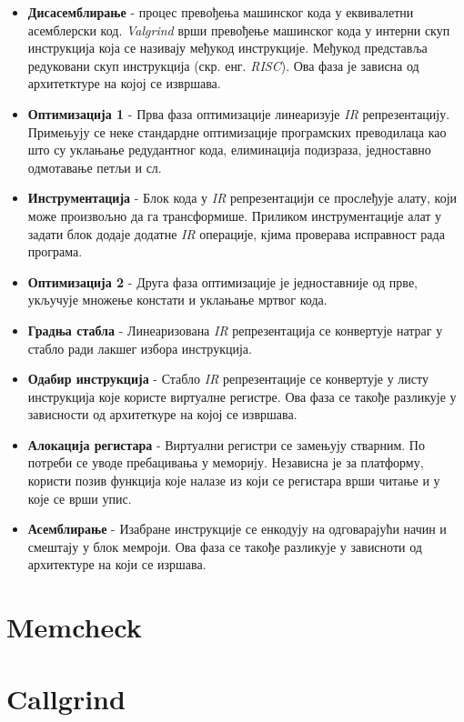 \documentclass[12pt,oneside]{memoir}
\begin{document}
\begin{itemize}
  \item \textbf{ Дисасемблирање } - процес превођења машинског кода у еквивалетни асемблерски код. \textit{Valgrind} врши превођење машинског кода у интерни скуп инструкција која се називају међукод инструкције. Међукод представља редуковани скуп инструкција (скр. енг. \textit{RISC}). Ова фаза је зависна од архитетктуре на којој се извршава.
  \item \textbf{ Оптимизација 1} - Прва фаза оптимизације линеаризује \textit{IR} репрезентацију. Примењују се неке стандардне оптимизације програмских преводилаца као што су уклањање редудантног кода, елиминација подизраза, једноставно одмотавање петљи и сл.
  \item \textbf{ Инструментација} - Блок кода у \textit{IR} репрезентацији се прослеђује алату, који може произвољно да га трансформише. Приликом инструментације алат у задати блок додаје додатне \textit{IR} операције, кјима проверава исправност рада програма.
  \item \textbf{ Оптимизација 2 } - Друга фаза оптимизације је једноставније од прве, укључује множење констати и уклањање мртвог кода.
  \item \textbf{ Градња стабла } - Линеаризована \textit{IR} репрезентација се конвертује натраг у стабло ради лакшег избора инструкција.
  \item \textbf{ Одабир инструкција } - Стабло \textit{IR} репрезентације се конвертује у листу инструкција које користе виртуалне регистре. Ова фаза се такође разликује у зависности од архитеткуре на којој се извршава. 
  \item \textbf{ Алокација регистара} - Виртуални регистри се замењују стварним. По потреби се уводе пребацивања у меморију. Независна је за платформу, користи позив функција које налазе из који се регистара врши читање и у које се врши упис.
  \item \textbf{ Асемблирање } - Изабране инструкције се енкодују на одговарајући начин и смештају у блок мемроји. Ова фаза се такође разликује у зависноти од архитектуре на који се изршава. ~\cite{SeeMIPSRun}
\end{itemize}

\section{Memcheck}

\section{Callgrind}
\end{document}
